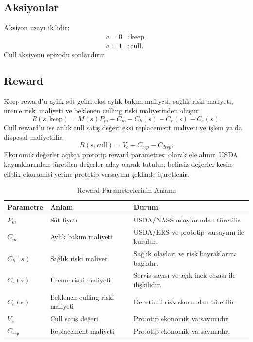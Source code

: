 \documentclass[conference]{IEEEtran}
\begin{document}
\subsection{Aksiyonlar}
Aksiyon uzayı ikilidir:
\begin{align}
    a=0 &: \mathrm{keep},\\
    a=1 &: \mathrm{cull}.
\end{align}
Cull aksiyonu epizodu sonlandırır.

\subsection{Reward}
Keep reward'u aylık süt geliri eksi aylık bakım maliyeti, sağlık riski
maliyeti, üreme riski maliyeti ve beklenen culling riski maliyetinden oluşur:
\begin{equation}
R(s,\mathrm{keep}) =
M(s)P_m - C_m - C_h(s) - C_r(s) - C_e(s).
\end{equation}
Cull reward'u ise anlık cull satış değeri eksi replacement maliyeti ve işlem
ya da disposal maliyetidir:
\begin{equation}
R(s,\mathrm{cull}) = V_c - C_{rep} - C_{disp}.
\end{equation}
Ekonomik değerler açıkça prototip reward parametresi olarak ele alınır. USDA
kaynaklarından türetilen değerler aday olarak tutulur; belirsiz değerler kesin
çiftlik ekonomisi yerine prototip varsayımı şeklinde işaretlenir.

\begin{table}[!t]
\caption{Reward Parametrelerinin Anlamı}
\label{tab:reward_parameters}
\centering
\begin{tabular}{p{}p{}p{}}
\toprule
Parametre & Anlam & Durum \\
\midrule
\(P_m\) & Süt fiyatı & USDA/NASS adaylarından türetilir. \\
\(C_m\) & Aylık bakım maliyeti & USDA/ERS ve prototip varsayımı ile kurulur. \\
\(C_h(s)\) & Sağlık riski maliyeti & Sağlık olayları ve risk bayraklarına bağlıdır. \\
\(C_r(s)\) & Üreme riski maliyeti & Servis sayısı ve açık inek cezası ile ilişkilidir. \\
\(C_e(s)\) & Beklenen culling riski maliyeti & Denetimli risk skorundan türetilir. \\
\(V_c\) & Cull satış değeri & Prototip ekonomik varsayımıdır. \\
\(C_{rep}\) & Replacement maliyeti & Prototip ekonomik varsayımıdır. \\
\bottomrule
\end{tabular}
\end{table}
\end{document}
